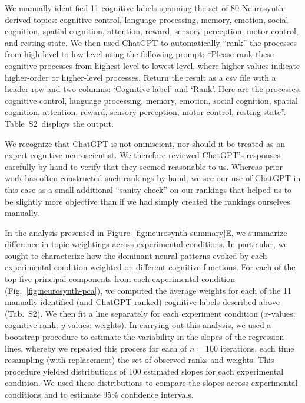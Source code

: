 \documentclass[english, 11pt]{article}
\newcommand{\topicTags}{S2}
\begin{document}
We manually identified 11 cognitive labels spanning the set of 80
Neurosynth-derived topics: cognitive control, language processing, memory,
emotion, social cognition, spatial cognition, attention, reward, sensory
perception, motor control, and resting state. We then used ChatGPT to
automatically ``rank'' the processes from high-level to low-level using the
following prompt: ``Please rank these cognitive processes from highest-level to
lowest-level, where higher values indicate higher-order or higher-level
processes. Return the result as a csv file with a header row and two columns:
`Cognitive label' and `Rank'. Here are the processes: cognitive control,
language processing, memory, emotion, social cognition, spatial cognition,
attention, reward, sensory perception, motor control, resting state''.
Table~\topicTags~displays the output.

We recognize that ChatGPT is not omniscient, nor should it be treated as an
expert cognitive neuroscientist. We therefore reviewed ChatGPT's responses
carefully by hand to verify that they seemed reasonable to us. Whereas prior
work has often constructed such rankings by hand, we see our use of ChatGPT in
this case as a small additional ``sanity check'' on our rankings that helped us
to be slightly more objective than if we had simply created the rankings
ourselves manually.

In the analysis presented in Figure~\ref{fig:neurosynth-summary}E, we summarize
difference in topic weightings across experimental conditions. In particular,
we sought to characterize how the dominant neural patterns evoked by each
experimental condition weighted on different cognitive functions. For each of
the top five principal components from each experimental condition
(Fig.~\ref{fig:neurosynth-pca}), we computed the average weights for each of
the 11 manually identified (and ChatGPT-ranked) cognitive labels described
above (Tab.~\topicTags). We then fit a line separately for each experiment
condition ($x$-values: cognitive rank; $y$-values: weights). In carrying out
this analysis, we used a bootstrap procedure to estimate the variability in the
slopes of the regression lines, whereby we repeated this process for each of $n
= 100$ iterations, each time resampling (with replacement) the set of observed
ranks and weights. This procedure yielded distributions of 100 estimated slopes
for each experimental condition. We used these distributions to compare the
slopes across experimental conditions and to estimate 95\% confidence
intervals.
\end{document}
